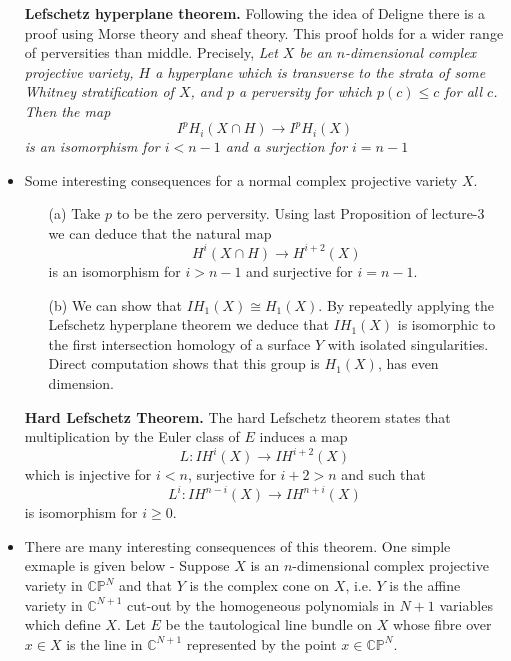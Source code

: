 \documentclass[11pt]{article}
\begin{document}
\begin{itemize}
    \item[] \textbf{Lefschetz hyperplane theorem.} Following the idea of Deligne there is a proof using Morse theory and sheaf theory. This proof holds for a wider range of perversities than middle. Precisely, \textit{ Let $X$ be an $n$-dimensional complex projective variety, $H$ a hyperplane which is transverse to the strata of some Whitney stratification of $X$, and $p$ a perversity for which $p(c) \leq c$ for all $c$. Then the map $$
    I^p H_i(X \cap H) \rightarrow I^p H_i(X)
    $$
    is an isomorphism for $i<n-1$ and a surjection for $i=n-1$}
    \item Some interesting consequences for a normal complex projective variety $X$.
    \begin{itemize}
        \item[(a)] Take $p$ to be the zero perversity. Using last Proposition of lecture-3 we can deduce that the natural map
        $$
        H^i(X \cap H) \rightarrow H^{i+2}(X)
        $$
        is an isomorphism for $i>n-1$ and surjective for $i=n-1$. 
        \item[(b)] We can show that $I H_1(X) \cong H_1(X)$. By repeatedly applying the Lefschetz hyperplane theorem we deduce that $I H_1(X)$ is isomorphic to the first intersection homology of a surface $Y$ with isolated singularities. Direct computation shows that this group is $H_1(X)$, has even dimension.
    \end{itemize}
 \item[] \textbf{Hard Lefschetz Theorem.} The hard Lefschetz theorem states that multiplication by the Euler class of $E$ induces a map
 $$
 L: I H^i(X) \rightarrow I H^{i+2}(X)
 $$
 which is injective for $i<n$, surjective for $i+2>n$ and such that
 $$
 L^i: I H^{n-i}(X) \rightarrow I H^{n+i}(X)
 $$ is isomorphism for $i \geq 0$.
 \item There are many interesting consequences of this theorem. One simple exmaple is given below - Suppose $X$ is an $n$-dimensional complex projective variety in $\mathbb{C P}^N$ and that $Y$ is the complex cone on $X$, i.e. $Y$ is the affine variety in $\mathbb{C}^{N+1}$ cut-out by the homogeneous polynomials in $N+1$ variables which define $X$. Let $E$ be the tautological line bundle on $X$ whose fibre over $x \in X$ is the line in $\mathbb{C}^{N+1}$ represented by the point $x \in \mathbb{C P}^N$.


\end{itemize}
\end{document}
